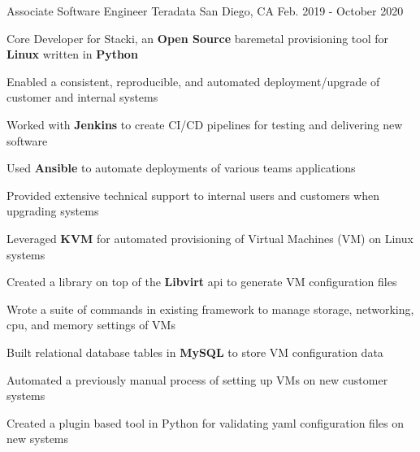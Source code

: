 

\begin{cventries}

  \cventry
    {Associate Software Engineer} %
    {\color{teradataorange}Teradata} %
    {San Diego, CA} %
    {Feb. 2019 - October 2020} %
    {
      \begin{cvitems} %
        \item{ Core Developer for Stacki, an \textbf{Open Source} baremetal provisioning tool for \textbf{Linux} written in \textbf{Python} }
        \item{ Enabled a consistent, reproducible, and automated deployment/upgrade of customer and internal systems }
        \item{ Worked with \textbf{Jenkins} to create CI/CD pipelines for testing and delivering new software }
        \item{ Used \textbf{Ansible} to automate deployments of various teams applications }
        \item{ Provided extensive technical support to internal users and customers when upgrading systems } 
        \item{ Leveraged \textbf{KVM} for automated provisioning of Virtual Machines (VM) on Linux systems }
        \item{ Created a library on top of the \textbf{Libvirt} api to generate VM configuration files }
        \item{ Wrote a suite of commands in existing framework to manage storage, networking, cpu, and memory settings of VMs }
        \item{ Built relational database tables in \textbf{MySQL} to store VM configuration data}
        \item{ Automated a previously manual process of setting up VMs on new customer systems }
        \item{ Created a plugin based tool in Python for validating yaml configuration files on new systems }
      \end{cvitems}
    }


\end{cventries}
